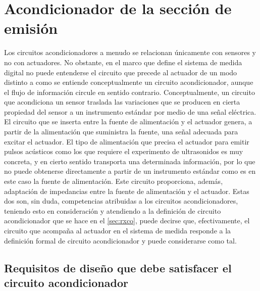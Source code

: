


\section{Acondicionador de la sección de emisión}

Los circuitos acondicionadores a menudo se relacionan únicamente con
sensores y no con actuadores. No obstante, en el marco que define el
sistema de medida digital no puede entenderse el circuito que precede al
actuador de un modo distinto a como se entiende conceptualmente un circuito
acondicionador, aunque el flujo de información circule en sentido
contrario. Conceptualmente, un circuito que acondiciona un sensor traslada
las variaciones que se producen en cierta propiedad del sensor a un
instrumento estándar por medio de una señal eléctrica. El circuito que se
inserta entre la fuente de alimentación y el actuador genera, a partir de
la alimentación que suministra la fuente, una señal adecuada para excitar
el actuador. El tipo de alimentación que precisa el actuador para emitir
pulsos acústicos como los que requiere el experimento de ultrasonidos es
muy concreta, y en cierto sentido transporta una determinada información,
por lo que no puede obtenerse directamente a partir de un instrumento
estándar como es en este caso la fuente de alimentación. Este circuito
proporciona, además, adaptación de impedancias entre la fuente de
alimentación y el actuador. Estas dos son, sin duda, competencias
atribuidas a los circuitos acondicionadores, teniendo esto en consideración
y atendiendo a la definición de circuito acondicionador que se hace en el
\cref{sec:rxco}, puede decirse que, efectivamente, el circuito que acompaña
al actuador en el sistema de medida responde a la definición formal de
circuito acondicionador y puede considerarse como tal.


\subsection[Requisitos de diseño del acondicionador]{Requisitos de diseño
que debe satisfacer el circuito acondicionador}

